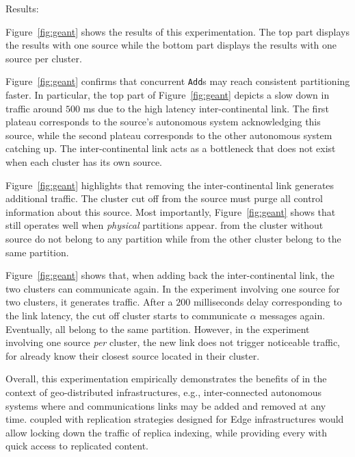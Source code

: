 \begin{asparadesc}
\item [Results:]

Figure~\ref{fig:geant} shows the results of this experimentation. The
top part displays the results with one source while the bottom part
displays the results with one source per cluster.

\noindent Figure~\ref{fig:geant} confirms that concurrent
\texttt{Add}s may reach consistent partitioning faster. In particular,
the top part of Figure~\ref{fig:geant} depicts a slow down in traffic
around $500$ ms due to the high latency inter-continental link. The
first plateau corresponds to the source's autonomous system
acknowledging this source, while the second plateau corresponds to the
other autonomous system catching up.  The inter-continental link acts
as a bottleneck that does not exist when each cluster has its own
source.

\noindent Figure~\ref{fig:geant} highlights that removing the
inter-continental link generates additional traffic. The cluster cut
off from the source must purge all control information about this
source.  Most importantly, Figure~\ref{fig:geant} shows that \NAME
still operates well when \emph{physical} partitions appear. \Processes
from the cluster without source do not belong to any partition while
\processes from the other cluster belong to the same partition. 

\noindent Figure~\ref{fig:geant} shows that, when adding back the
inter-continental link, the two clusters can communicate again. In the
experiment involving one source for two clusters, it generates
traffic. After a $200$ milliseconds delay corresponding to the link
latency, the cut off cluster starts to communicate $\alpha$ messages
again. Eventually, all \processes belong to the same
partition. However, in the experiment involving one source \emph{per}
cluster, the new link does not trigger noticeable traffic, for
\processes already know their closest source located in their cluster.

\noindent Overall, this experimentation empirically demonstrates the
benefits of \NAME in the context of geo-distributed infrastructures,
e.g., inter-connected autonomous systems where \processes and
communications links may be added and removed at any time. \NAME
coupled with replication strategies designed for Edge infrastructures
would allow locking down the traffic of replica indexing, while
providing every \process with quick access to replicated content.

\end{asparadesc}

